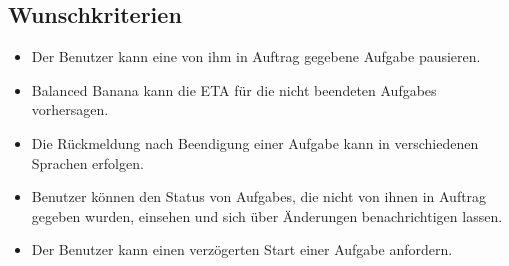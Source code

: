 \documentclass[a4paper,12pt]{article}
\begin{document}
\subsection{Wunschkriterien}
\begin{itemize}[nosep]

	\item Der \gls{Benutzer} kann eine von ihm in Auftrag gegebene \gls{Aufgabe} pausieren.	
	
	\item Balanced Banana kann die \gls{ETA} für die nicht beendeten \glspl{Aufgabe} vorhersagen.
	
	\item Die Rückmeldung nach Beendigung einer \gls{Aufgabe} kann in verschiedenen Sprachen erfolgen.
	
	\item \gls{Benutzer} können den Status von \glspl{Aufgabe}, die nicht von ihnen in Auftrag gegeben wurden, einsehen und 	sich über Änderungen benachrichtigen lassen.
	
	\item Der \gls{Benutzer} kann einen verzögerten Start einer \gls{Aufgabe} anfordern.
	
\end{itemize}
\end{document}
